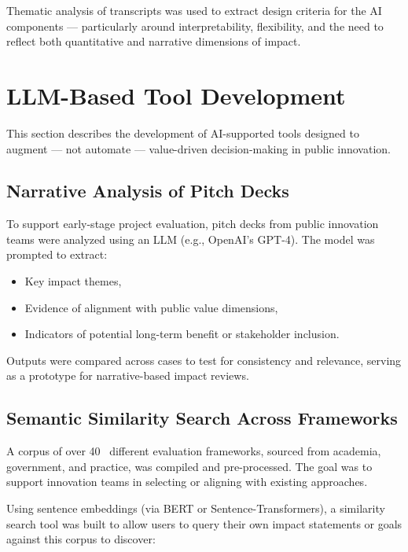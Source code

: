Thematic analysis of transcripts was used to extract design criteria for the AI components — particularly around interpretability, flexibility, and the need to reflect both quantitative and narrative dimensions of impact.

\section{LLM-Based Tool Development}\label{sec:llm-based-tool-development}

This section describes the development of AI-supported tools designed to augment — not automate — value-driven decision-making in public innovation.

\subsection{Narrative Analysis of Pitch Decks}\label{subsec:narrative-analysis-of-pitch-decks}

To support early-stage project evaluation, pitch decks from public innovation teams were analyzed using an LLM (e.g., OpenAI’s GPT-4).
The model was prompted to extract:

\begin{itemize}
    \item Key impact themes,
    \item Evidence of alignment with public value dimensions,
    \item Indicators of potential long-term benefit or stakeholder inclusion.
\end{itemize}

Outputs were compared across cases to test for consistency and relevance, serving as a prototype for narrative-based impact reviews.

\subsection{Semantic Similarity Search Across Frameworks}\label{subsec:semantic-similarity-search-across-frameworks}

A corpus of over 40~ different evaluation frameworks, sourced from academia, government, and practice, was compiled and pre-processed.
The goal was to support innovation teams in selecting or aligning with existing approaches.

Using sentence embeddings (via BERT or Sentence-Transformers), a similarity search tool was built to allow users to query their own impact statements or goals against this corpus to discover:

